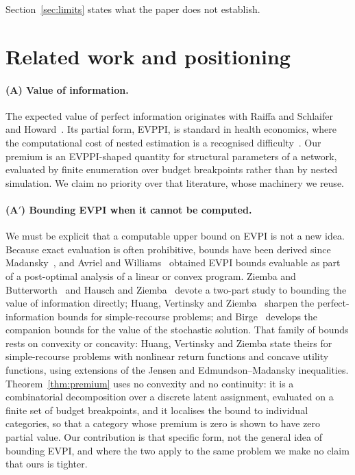 \documentclass[pdflatex,sn-mathphys-num]{sn-jnl}
\theoremstyle{thmstyleone}
\theoremstyle{thmstyletwo}
\theoremstyle{thmstylethree}
\begin{document}
\noindent Section~\ref{sec:limits} states what the paper does not establish.

\section{Related work and positioning}\label{sec:related}

\paragraph{(A) Value of information.} The expected value of perfect
information originates with Raiffa and Schlaifer~\cite{raiffa1961} and
Howard~\cite{howard1966}. Its partial form, EVPPI, is standard in health
economics, where the computational cost of nested estimation is a recognised
difficulty~\cite{strong2014,heath2024}. Our premium is an EVPPI-shaped
quantity for structural parameters of a network, evaluated by finite
enumeration over budget breakpoints rather than by nested simulation. We
claim no priority over that literature, whose machinery we reuse.

\paragraph{(A$'$) Bounding EVPI when it cannot be computed.} We must be
explicit that a computable upper bound on EVPI is not a new idea. Because
exact evaluation is often prohibitive, bounds have been derived since
Madansky~\cite{madansky1960}, and Avriel and Williams~\cite{avriel1970}
obtained EVPI bounds evaluable as part of a post-optimal analysis of a linear
or convex program. Ziemba and Butterworth~\cite{ziemba1975} and Hausch and
Ziemba~\cite{hausch1983} devote a two-part study to bounding the value of
information directly; Huang, Vertinsky and Ziemba~\cite{huang1977} sharpen
the perfect-information bounds for simple-recourse problems; and
Birge~\cite{birge1982} develops the companion bounds for the value of the
stochastic solution. That family of
bounds rests on convexity or concavity: Huang, Vertinsky and Ziemba state
theirs for simple-recourse problems with nonlinear return functions and
concave utility functions, using extensions of the Jensen and
Edmundson--Madansky inequalities. Theorem~\ref{thm:premium} uses no
convexity and no continuity: it is a combinatorial decomposition over a
discrete latent assignment, evaluated on a finite set of budget breakpoints,
and it localises the bound to individual categories, so that a category whose
premium is zero is shown to have zero partial value. Our contribution is that
specific form, not the general idea of bounding EVPI, and where the two apply to
the same problem we make no claim that ours is tighter.
\end{document}
